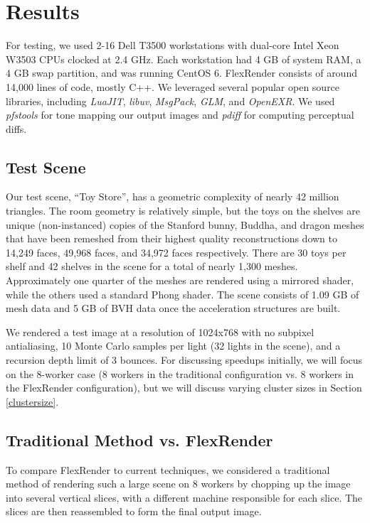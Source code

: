 \documentclass[a4paper,twoside]{article}
\begin{document}
\section{Results}
\label{results}

For testing, we used 2-16 Dell T3500 workstations with dual-core Intel Xeon
W3503 CPUs clocked at 2.4 GHz. Each workstation had 4 GB of system RAM, a 4 GB
swap partition, and was running CentOS 6. FlexRender consists of around 14,000
lines of code, mostly C++. We leveraged several popular open source libraries,
including \emph{LuaJIT}, \emph{libuv}, \emph{MsgPack}, \emph{GLM}, and
\emph{OpenEXR}. We used \emph{pfstools} for tone mapping our output images and
\emph{pdiff} for computing perceptual diffs.

\subsection{Test Scene}
\label{toystore}

Our test scene, ``Toy Store'', has a geometric complexity of nearly 42 million
triangles. The room geometry is relatively simple, but the toys on the shelves
are unique (non-instanced) copies of the Stanford bunny, Buddha, and dragon
meshes that have been remeshed from their highest quality reconstructions down
to 14,249 faces, 49,968 faces, and 34,972 faces respectively. There are 30 toys
per shelf and 42 shelves in the scene for a total of nearly 1,300 meshes.
Approximately one quarter of the meshes are rendered using a mirrored shader,
while the others used a standard Phong shader. The scene consists of 1.09 GB of
mesh data and 5 GB of BVH data once the acceleration structures are built.

We rendered a test image at a resolution of 1024x768 with no subpixel
antialiasing, 10 Monte Carlo samples per light (32 lights in the scene), and a
recursion depth limit of 3 bounces. For discussing speedups initially, we will
focus on the 8-worker case (8 workers in the traditional configuration vs. 8
workers in the FlexRender configuration), but we will discuss varying cluster
sizes in Section \ref{clustersize}.

\subsection{Traditional Method vs. FlexRender}

To compare FlexRender to current techniques, we considered a traditional method
of rendering such a large scene on 8 workers by chopping up the image into
several vertical slices, with a different machine responsible for each slice.
The slices are then reassembled to form the final output image.
\end{document}

